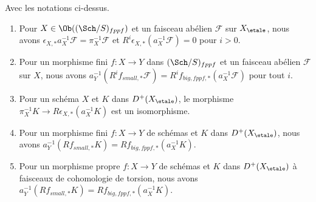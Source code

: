 \begin{lemma}
\label{lemma-V-C-all-n-etale-fppf}
Avec les notations ci-dessus.
\begin{enumerate}
\item Pour $X \in \Ob((\Sch/S)_{fppf})$ et un faisceau abélien $\mathcal{F}$
sur $X_\etale$, nous avons
$\epsilon_{X, *}a_X^{-1}\mathcal{F} = \pi_X^{-1}\mathcal{F}$
et $R^i\epsilon_{X, *}(a_X^{-1}\mathcal{F}) = 0$ pour $i > 0$.
\item Pour un morphisme fini $f : X \to Y$ dans $(\Sch/S)_{fppf}$
et un faisceau abélien $\mathcal{F}$ sur $X$, nous avons
$a_Y^{-1}(R^if_{small, *}\mathcal{F}) =
R^if_{big, fppf, *}(a_X^{-1}\mathcal{F})$
pour tout $i$.
\item Pour un schéma $X$ et $K$ dans $D^+(X_\etale)$, le morphisme
$\pi_X^{-1}K \to R\epsilon_{X, *}(a_X^{-1}K)$ est un isomorphisme.
\item Pour un morphisme fini $f : X \to Y$ de schémas
et $K$ dans $D^+(X_\etale)$, nous avons
$a_Y^{-1}(Rf_{small, *}K) = Rf_{big, fppf, *}(a_X^{-1}K)$.
\item Pour un morphisme propre $f : X \to Y$ de schémas
et $K$ dans $D^+(X_\etale)$ à faisceaux de cohomologie de torsion, nous avons
$a_Y^{-1}(Rf_{small, *}K) = Rf_{big, fppf, *}(a_X^{-1}K)$.
\end{enumerate}
\end{lemma}

